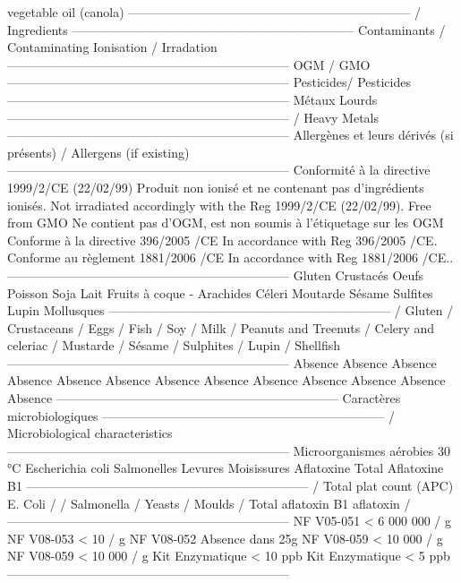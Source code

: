 vegetable oil (canola)
--------------------------------------------------------------------
/ Ingredients
--------------------------------------------------------------------
Contaminants / Contaminating
Ionisation /  Irradation
--------------------------------------------------------------------
OGM /  GMO
--------------------------------------------------------------------
Pesticides/  Pesticides
--------------------------------------------------------------------
Métaux Lourds
--------------------------------------------------------------------
/  Heavy Metals
--------------------------------------------------------------------
Allergènes et leurs dérivés (si présents)
/  Allergens (if existing)
--------------------------------------------------------------------
Conformité à la directive 1999/2/CE (22/02/99) 
Produit non ionisé et ne contenant pas d’ingrédients ionisés. 
Not irradiated 
accordingly with the Reg 1999/2/CE (22/02/99).
Free from GMO
Ne contient pas d’OGM, est non soumis à l’étiquetage sur les OGM 
Conforme à la directive 396/2005 /CE 
In accordance with Reg 396/2005 /CE.
Conforme au règlement 1881/2006 /CE  
In accordance with Reg 1881/2006 /CE..
--------------------------------------------------------------------
Gluten
Crustacés
Oeufs
Poisson
Soja
Lait
Fruits à coque - Arachides
Céleri
Moutarde
Sésame
Sulfites
Lupin
Mollusques
--------------------------------------------------------------------
/ Gluten
/ Crustaceans
/ Eggs
/ Fish
/ Soy
/ Milk
/ Peanuts and Treenuts
/ Celery and celeriac
/ Mustarde
/ Sésame
/ Sulphites
/ Lupin
/ Shellfish
--------------------------------------------------------------------
Absence
Absence
Absence
Absence
Absence
Absence
Absence
Absence
Absence
Absence
Absence
Absence
Absence
--------------------------------------------------------------------
Caractères microbiologiques
--------------------------------------------------------------------
/ Microbiological characteristics
--------------------------------------------------------------------
Microorganismes aérobies 30 °C
Escherichia coli 
Salmonelles
Levures
Moisissures
Aflatoxine Total
Aflatoxine B1
--------------------------------------------------------------------
/ Total plat count (APC)
E. Coli
/  
/ Salmonella
/ Yeasts
/ Moulds
/ Total aflatoxin
B1 aflatoxin
/ 
--------------------------------------------------------------------
NF V05-051 < 6 000 000 / g
NF V08-053 < 10 / g
NF V08-052 Absence dans 25g
NF V08-059 < 10 000 / g
NF V08-059 < 10 000 / g
Kit Enzymatique < 10 ppb
Kit Enzymatique < 5 ppb
--------------------------------------------------------------------

